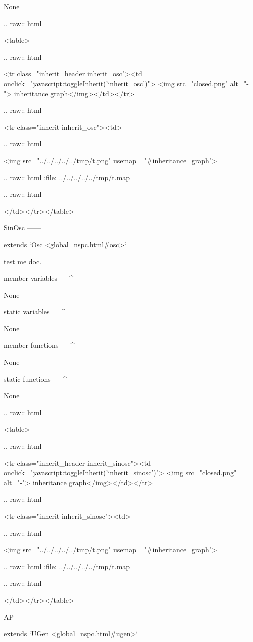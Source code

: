 	None


  .. raw:: html

   <table>


  .. raw:: html

   <tr class="inherit_header inherit_osc"><td onclick="javascript:toggleInherit('inherit_osc')"> <img src="closed.png" alt="-"> inheritance graph</img></td></tr>


  .. raw:: html

   <tr class="inherit inherit_osc"><td>


  .. raw:: html

   <img src="../../../../../tmp/t.png" usemap ="#inheritance_graph">


  .. raw:: html
   :file:   ../../../../../tmp/t.map


  .. raw:: html

   </td></tr></table>

SinOsc
------

extends `Osc <global_nspc.html#osc>`_ 

test me doc.

member variables
^^^^^^^^^^^^^^^^

	None

static variables
^^^^^^^^^^^^^^^^

	None

member functions
^^^^^^^^^^^^^^^^


	None

static functions
^^^^^^^^^^^^^^^^


	None


  .. raw:: html

   <table>


  .. raw:: html

   <tr class="inherit_header inherit_sinosc"><td onclick="javascript:toggleInherit('inherit_sinosc')"> <img src="closed.png" alt="-"> inheritance graph</img></td></tr>


  .. raw:: html

   <tr class="inherit inherit_sinosc"><td>


  .. raw:: html

   <img src="../../../../../tmp/t.png" usemap ="#inheritance_graph">


  .. raw:: html
   :file:   ../../../../../tmp/t.map


  .. raw:: html

   </td></tr></table>

AP
--

extends `UGen <global_nspc.html#ugen>`_ 

